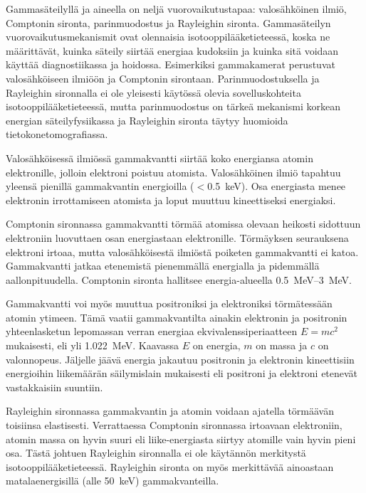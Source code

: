 Gammasäteilyllä ja aineella on neljä vuorovaikutustapaa: valosähköinen ilmiö, Comptonin sironta, parinmuodostus ja Rayleighin sironta. Gammasäteilyn vuorovaikutusmekanismit ovat olennaisia isotooppilääketieteessä, koska ne määrittävät, kuinka säteily siirtää energiaa kudoksiin ja kuinka sitä voidaan käyttää diagnostiikassa ja hoidossa\cite{cherry_interaction_2012}. Esimerkiksi gammakamerat perustuvat valosähköiseen ilmiöön ja Comptonin sirontaan. Parinmuodostuksella ja Rayleighin sironnalla ei ole yleisesti käytössä olevia sovelluskohteita isotooppilääketieteessä, mutta parinmuodostus on tärkeä mekanismi korkean energian säteilyfysiikassa ja Rayleighin sironta täytyy huomioida tietokonetomografiassa.\cite{cherry_interaction_2012}

Valosähköisessä ilmiössä gammakvantti siirtää koko energiansa atomin elektronille, jolloin elektroni poistuu atomista. Valosähköinen ilmiö tapahtuu yleensä pienillä gammakvantin energioilla ($<$\qty{0.5}{\kilo\electronvolt}). Osa energiasta menee elektronin irrottamiseen atomista ja loput muuttuu kineettiseksi energiaksi.\cite{cherry_interaction_2012}

Comptonin sironnassa gammakvantti törmää atomissa olevaan heikosti sidottuun elektroniin luovuttaen osan energiastaan elektronille. Törmäyksen seurauksena elektroni irtoaa, mutta valosähköisestä ilmiöstä poiketen gammakvantti ei katoa. Gammakvantti jatkaa etenemistä pienemmällä energialla ja pidemmällä aallonpituudella. Comptonin sironta hallitsee energia-alueella \qtyrange{0.5}{3}{\mega\electronvolt}.\cite{cherry_interaction_2012}

Gammakvantti voi myös muuttua positroniksi ja elektroniksi törmätessään atomin ytimeen. Tämä vaatii gammakvantilta ainakin elektronin ja positronin yhteenlasketun lepomassan verran energiaa ekvivalenssiperiaatteen $E=mc^2$ mukaisesti, eli yli \qty{1.022}{\mega\electronvolt}. Kaavassa $E$ on energia, $m$ on massa ja $c$ on valonnopeus. Jäljelle jäävä energia jakautuu positronin ja elektronin kineettisiin energioihin liikemäärän säilymislain mukaisesti eli positroni ja elektroni etenevät vastakkaisiin suuntiin.\cite{cherry_interaction_2012}

Rayleighin sironnassa gammakvantin ja atomin voidaan ajatella törmäävän toisiinsa elastisesti. Verrattaessa Comptonin sironnassa irtoavaan elektroniin, atomin massa on hyvin suuri eli liike-energiasta siirtyy atomille vain hyvin pieni osa. Tästä johtuen Rayleighin sironnalla ei ole käytännön merkitystä isotooppilääketieteessä. Rayleighin sironta on myös merkittävää ainoastaan matalaenergisillä (alle \qty{50}{\kilo\electronvolt}) gammakvanteilla.\cite{cherry_interaction_2012}

